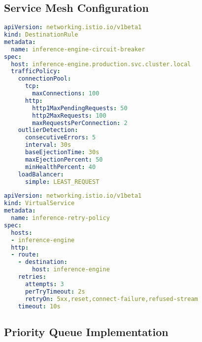 \documentclass[12pt,a4paper]{article}
\begin{document}
\newpage
\subsection{Service Mesh Configuration}

\begin{lstlisting}[language=yaml, caption=Configuration Istio - Circuit Breaker]
apiVersion: networking.istio.io/v1beta1
kind: DestinationRule
metadata:
  name: inference-engine-circuit-breaker
spec:
  host: inference-engine.production.svc.cluster.local
  trafficPolicy:
    connectionPool:
      tcp:
        maxConnections: 100
      http:
        http1MaxPendingRequests: 50
        http2MaxRequests: 100
        maxRequestsPerConnection: 2
    outlierDetection:
      consecutiveErrors: 5
      interval: 30s
      baseEjectionTime: 30s
      maxEjectionPercent: 50
      minHealthPercent: 40
    loadBalancer:
      simple: LEAST_REQUEST
\end{lstlisting}

\begin{lstlisting}[language=yaml, caption=Configuration Istio - Retry Policy]
apiVersion: networking.istio.io/v1beta1
kind: VirtualService
metadata:
  name: inference-retry-policy
spec:
  hosts:
  - inference-engine
  http:
  - route:
    - destination:
        host: inference-engine
    retries:
      attempts: 3
      perTryTimeout: 2s
      retryOn: 5xx,reset,connect-failure,refused-stream
    timeout: 10s
\end{lstlisting}

\newpage
\subsection{Priority Queue Implementation}
\end{document}
